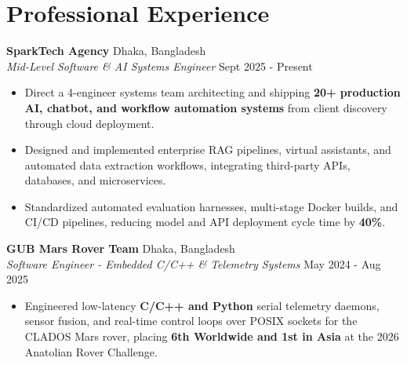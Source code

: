 \documentclass[9.5pt,a4paper]{article}
\begin{document}
\section*{Professional Experience}
\noindent
\textbf{SparkTech Agency} \hfill Dhaka, Bangladesh\\
\textit{Mid-Level Software \& AI Systems Engineer} \hfill Sept 2025 - Present
\begin{itemize}
    \item Direct a 4-engineer systems team architecting and shipping \textbf{20+ production AI, chatbot, and workflow automation systems} from client discovery through cloud deployment.
    \item Designed and implemented enterprise RAG pipelines, virtual assistants, and automated data extraction workflows, integrating third-party APIs, databases, and microservices.
    \item Standardized automated evaluation harnesses, multi-stage Docker builds, and CI/CD pipelines, reducing model and API deployment cycle time by \textbf{40\%}.
\end{itemize}
\vspace{0.6pt}
\noindent
\textbf{GUB Mars Rover Team} \hfill Dhaka, Bangladesh\\
\textit{Software Engineer - Embedded C/C++ \& Telemetry Systems} \hfill May 2024 - Aug 2025
\begin{itemize}
    \item Engineered low-latency \textbf{C/C++ and Python} serial telemetry daemons, sensor fusion, and real-time control loops over POSIX sockets for the CLADOS Mars rover, placing \textbf{6th Worldwide and 1st in Asia} at the 2026 Anatolian Rover Challenge.
\end{itemize}
\vspace{0.6pt}
\end{document}
